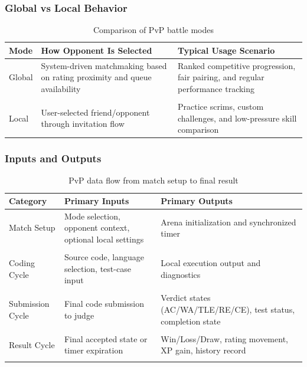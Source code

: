 \documentclass[12pt]{article}
\begin{document}
\subsubsection{Global vs Local Behavior}

\begin{table}[htbp]
\centering
\begin{tabularx}{\textwidth}{>{\raggedright\arraybackslash}p{3cm} >{\raggedright\arraybackslash}X >{\raggedright\arraybackslash}X}
\toprule
\textbf{Mode} & \textbf{How Opponent Is Selected} & \textbf{Typical Usage Scenario} \\ 
\midrule
Global & System-driven matchmaking based on rating proximity and queue availability & Ranked competitive progression, fair pairing, and regular performance tracking \\ \\
Local & User-selected friend/opponent through invitation flow & Practice scrims, custom challenges, and low-pressure skill comparison \\
\bottomrule
\end{tabularx}
\caption{Comparison of PvP battle modes}
\end{table}

\subsubsection{Inputs and Outputs}

\begin{table}[ht]
\centering
\begin{tabularx}{\textwidth}{>{\raggedright\arraybackslash}p{3.2cm} >{\raggedright\arraybackslash}X >{\raggedright\arraybackslash}X}
\toprule
\textbf{Category} & \textbf{Primary Inputs} & \textbf{Primary Outputs} \\
\midrule
Match Setup & Mode selection, opponent context, optional local settings & Arena initialization and synchronized timer \\ \\
Coding Cycle & Source code, language selection, test-case input & Local execution output and diagnostics \\ \\
Submission Cycle & Final code submission to judge & Verdict states (AC/WA/TLE/RE/CE), test status, completion state \\ \\
Result Cycle & Final accepted state or timer expiration & Win/Loss/Draw, rating movement, XP gain, history record \\ \\
\bottomrule
\end{tabularx}
\caption{PvP data flow from match setup to final result}
\end{table}
\end{document}
